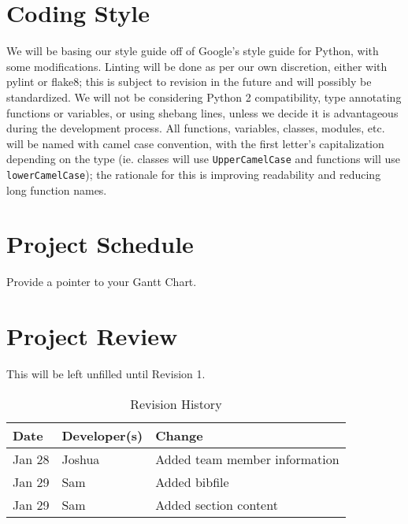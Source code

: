 \documentclass{article}
\begin{document}
\section{Coding Style}
We will be basing our style guide off of Google’s style guide for Python, with 
some modifications. Linting will be done as per our own discretion, either with 
pylint or flake8; this is subject to revision in the future and will possibly be 
standardized. We will not be considering Python 2 compatibility, type annotating 
functions or variables, or using shebang lines, unless we decide it is 
advantageous during the development process. All functions, variables, classes, 
modules, etc. will be named with camel case convention, with the first letter’s 
capitalization depending on the type (ie. classes will use 
\texttt{UpperCamelCase} and functions will use \texttt{lowerCamelCase}); the 
rationale for this is improving readability and reducing long function names.

\section{Project Schedule}
Provide a pointer to your Gantt Chart.

\section{Project Review}
This will be left unfilled until Revision 1.

\printbibliography{}

\begin{table}[h]
\caption{Revision History} \label{TblRevisionHistory}
\begin{tabularx}{\textwidth}{llX}
\toprule
\textbf{Date} & \textbf{Developer(s)} & \textbf{Change}\\
\midrule
Jan 28 & Joshua & Added team member information\\
Jan 29 & Sam & Added bibfile\\
Jan 29 & Sam & Added section content\\
\bottomrule
\end{tabularx}
\end{table}
\end{document}

